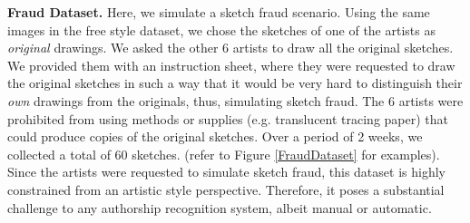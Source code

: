 \noindent\textbf{Fraud Dataset.}  Here, we simulate a sketch fraud scenario. Using the same images in the free style dataset, we chose the sketches of one of the artists as \emph{original} drawings. We asked the other 6 artists to draw all the original sketches. We provided them with an instruction sheet, where they were requested to draw the original sketches in such a way that it would be very hard to distinguish their \emph{own} drawings from the originals, thus, simulating sketch fraud. The 6 artists were prohibited from using methods or supplies (e.g. translucent tracing paper) that could produce copies of the original sketches. Over a period of 2 weeks, we collected a total of 60 sketches. (refer to Figure \ref{FraudDataset} for examples). Since the artists were requested to simulate sketch fraud, this dataset is highly constrained from an artistic style perspective. Therefore, it poses a substantial challenge to any authorship recognition system, albeit manual or automatic.




